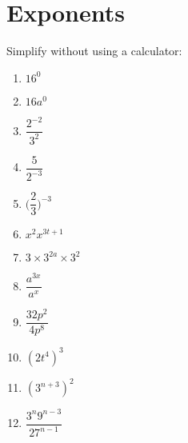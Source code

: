 \chapter{Exponents}
\begin{exercises}{}{
Simplify without using a calculator:
\begin{multicols}{2}
\begin{enumerate}[label=\textbf{\arabic*}., itemsep=4pt]
 \item $16^0$
 \item $16a^0$
 \item $\dfrac{2^{-2}}{3^2}$
 \item $ \dfrac{5}{2^{-3}}$
 \item $ \Big(\dfrac{2}{3}\Big)^{-3} $
 \item $ x^2 x^{3t+1} $
 \item $ 3 \times 3^{2a} \times 3^2$
 \item $ \dfrac{a^{3x}}{a^x} $
 \item $ \dfrac{32p^2}{4p^8}$
 \item $ (2t^4)^3$
 \item $ (3^{n+3})^2$
 \item $ \dfrac{3^n 9^{n-3}}{27^{n-1}}$
\end{enumerate}
\end{multicols}
}
\end{exercises}


